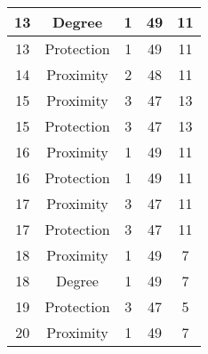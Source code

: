 \documentclass[results.tex]{subfiles}
\begin{document}
\begin{center}
\begin{tabular}{| c || c | c | c | c |}
            \hline
            13                      & Degree                       & 1                      & 49                      & 11                   \\
            \hline
            13                      & Protection                   & 1                      & 49                      & 11                   \\
            \hline
            14                      & Proximity                    & 2                      & 48                      & 11                   \\
            \hline
            15                      & Proximity                    & 3                      & 47                      & 13                   \\
            \hline
            15                      & Protection                   & 3                      & 47                      & 13                   \\
            \hline
            16                      & Proximity                    & 1                      & 49                      & 11                   \\
            \hline
            16                      & Protection                   & 1                      & 49                      & 11                   \\
            \hline
            17                      & Proximity                    & 3                      & 47                      & 11                   \\
            \hline
            17                      & Protection                   & 3                      & 47                      & 11                   \\
            \hline
            18                      & Proximity                    & 1                      & 49                      & 7                    \\
            \hline
            18                      & Degree                       & 1                      & 49                      & 7                    \\
            \hline
            19                      & Protection                   & 3                      & 47                      & 5                    \\
            \hline
            20                      & Proximity                    & 1                      & 49                      & 7                    \\

\end{tabular}
\end{center}
\end{document}
